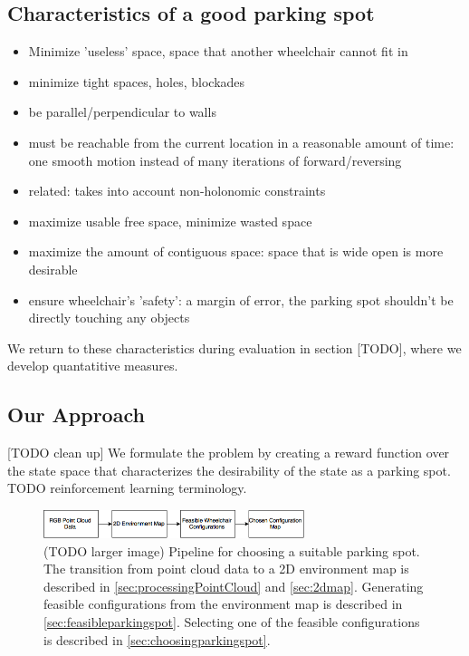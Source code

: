 \subsection{Characteristics of a good parking spot}
\begin{itemize}
\item Minimize 'useless' space, space that another wheelchair cannot fit in 
\item minimize tight spaces, holes, blockades
\item be parallel/perpendicular to walls
\item must be reachable from the current location in a reasonable amount of
time: one smooth motion instead of many iterations of forward/reversing
\item related: takes into account non-holonomic constraints
\item maximize usable free space, minimize wasted space
\item maximize the amount of contiguous space: space that is wide open is more
desirable
\item ensure wheelchair's 'safety': a margin of error, the parking spot
shouldn't be directly touching any objects
\end{itemize}

We return to these characteristics during evaluation in section [TODO], where we
develop quantatitive measures.



\subsection{Our Approach}

[TODO clean up]
We formulate the problem by creating a reward function over the state space
that characterizes the desirability of the state as a parking spot.
TODO reinforcement learning terminology.


\begin{figure}
\centering
\includegraphics[width=3in]{figures/rgbdmap.png}
\caption{(TODO larger image) Pipeline for choosing a suitable parking spot.
The transition from point cloud data to a 2D environment map is described in
\autoref{sec:processingPointCloud} and \autoref{sec:2dmap}. Generating feasible configurations from the
environment map is described in \autoref{sec:feasibleparkingspot}. Selecting one
of the feasible configurations is described in
\autoref{sec:choosingparkingspot}.}
\label{fig:rgbdmap}
\end{figure}

